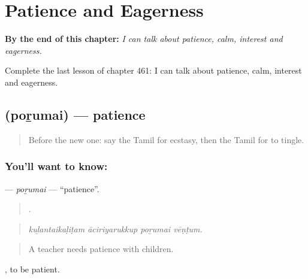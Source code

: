 
\chapter{Patience and Eagerness}
\label{ch:ta-patience-and-eagerness}

\begin{chapteropening}
\textbf{By the end of this chapter:} \emph{I can talk about patience, calm, interest and eagerness.}

Complete the last lesson of chapter 461: I can talk about patience, calm, interest and eagerness.
\end{chapteropening}

\section[\texorpdfstring{\ta{பொறுமை} (poṟumai)}{பொறுமை (poṟumai)}]{ (poṟumai) — patience}

\label{lesson:TA-C461-porumai}



\begin{quote}
Before the new one: say the Tamil for ecstasy, then the Tamil for to tingle.
\end{quote}

\subsection*{You'll want to know: }
\textbf{} — \emph{poṟumai} — \textquotedblleft{}patience\textquotedblright{}.

\begin{quote}
   .
\end{quote}

\begin{quote}
\emph{kuḻantaikaḷiṭam āciriyarukkup poṟumai vēṇṭum.}
\end{quote}

\begin{quote}
A teacher needs patience with children.
\end{quote}

 , to be patient.

